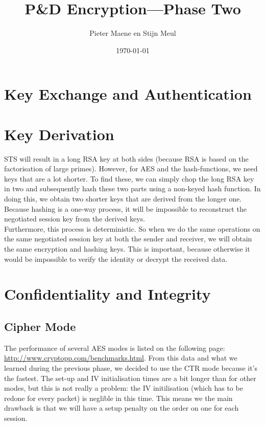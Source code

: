 \documentclass[a4paper]{article}
\title{P\&D Encryption---Phase Two}
\author{Pieter Maene en Stijn Meul}
\date{\today}
\begin{document}
\maketitle

\section{Key Exchange and Authentication}

\section{Key Derivation}

STS will result in a long RSA key at both sides (because RSA is based on the factorisation of large primes). However, for AES and the hash-functions, we need keys that are a lot shorter. To find these, we can simply chop the long RSA key in two and subsequently hash these two parts using a non-keyed hash function. In doing this, we obtain two shorter keys that are derived from the longer one. Because hashing is a one-way process, it will be impossible to reconstruct the negotiated session key from the derived keys.\\

Furthermore, this process is deterministic. So when we do the same operations on the same negotiated session key at both the sender and receiver, we will obtain the same encryption and hashing keys. This is important, because otherwise it would be impossible to verify the identity or decrypt the received data.\\

\section{Confidentiality and Integrity}

\subsection{Cipher Mode}

The performance of several AES modes is listed on the following page: \url{http://www.cryptopp.com/benchmarks.html}. From this data and what we learned during the previous phase, we decided to use the CTR mode because it's the fastest. The set-up and IV initialisation times are a bit longer than for other modes, but this is not really a problem: the IV initilisation (which has to be redone for every packet) is neglible in this time. This means we the main drawback is that we will have a setup penalty on the order on one {\micro\second} for each session.\\
\end{document}
